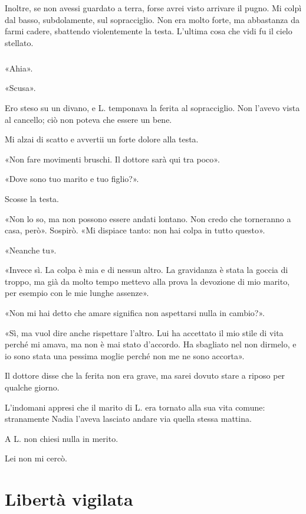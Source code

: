 \documentclass[a4paper,12pt]{book}
\begin{document}
Inoltre, se non avessi guardato a terra, forse avrei visto arrivare il pugno.
Mi colpì dal basso, subdolamente, sul sopracciglio. Non era molto forte, ma
abbastanza da farmi cadere, sbattendo violentemente la testa. L'ultima cosa che
vidi fu il cielo stellato.

\paragraph{}
«Ahia».

«Scusa».

Ero steso su un divano, e L. temponava la ferita al sopracciglio. Non l'avevo
vista al cancello; ciò non poteva che essere un bene.

Mi alzai di scatto e avvertii un forte dolore alla testa.

«Non fare movimenti bruschi. Il dottore sarà qui tra poco».

«Dove sono tuo marito e tuo figlio?».

Scosse la testa.

«Non lo so, ma non possono essere andati lontano. Non credo che torneranno a
casa, però». Sospirò. «Mi dispiace tanto: non hai colpa in tutto questo».

«Neanche tu».

«Invece sì. La colpa è mia e di nessun altro. La gravidanza è stata la goccia di
troppo, ma già da molto tempo mettevo alla prova la devozione di mio marito, per
esempio con le mie lunghe assenze».

«Non mi hai detto che amare significa non aspettarsi nulla in cambio?».

«Sì, ma vuol dire anche rispettare l'altro. Lui ha accettato il mio stile di
vita perché mi amava, ma non è mai stato d'accordo. Ha sbagliato nel non
dirmelo, e io sono stata una pessima moglie perché non me ne sono accorta».

Il dottore disse che la ferita non era grave, ma sarei dovuto stare a riposo per
qualche giorno.

L'indomani appresi che il marito di L. era tornato alla sua vita comune:
stranamente Nadia l'aveva lasciato andare via quella stessa mattina.

A L. non chiesi nulla in merito.

Lei non mi cercò.

\chapter{Libertà vigilata}
\end{document}
